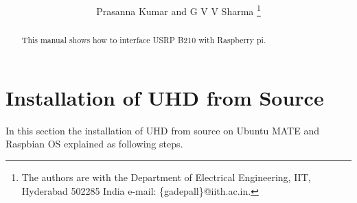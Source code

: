 \documentclass[journal,12pt,twocolumn]{IEEEtran}
\begin{document}
\title{
}
%
%
%

\author{Prasanna Kumar and G V V Sharma %
\thanks{The authors are with the Department
of Electrical Engineering, IIT, Hyderabad
502285 India e-mail: \{gadepall\}@iith.ac.in. 
}}



\maketitle

\tableofcontents

\bigskip

\begin{abstract}
This manual shows how to  interface USRP B210 with Raspberry pi. 
\end{abstract}

\section{Installation of UHD from Source}
In this section the installation of UHD from source on Ubuntu MATE and Raspbian OS explained as following steps.
\end{document}
